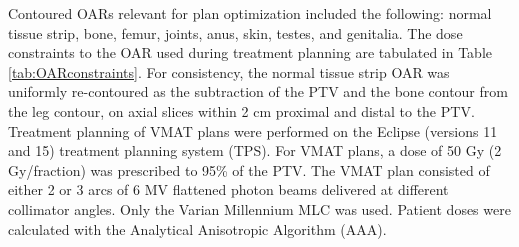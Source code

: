 \documentclass[aapm,graphicx,superscriptaddress]{revtex4-1}
\begin{document}
Contoured OARs relevant for plan optimization included the following: normal tissue strip, bone, femur, joints, anus, skin, testes, and genitalia. The dose constraints to the OAR used during treatment planning are tabulated in Table \ref{tab:OARconstraints}. For consistency, the normal tissue strip OAR was uniformly re-contoured as the subtraction of the PTV and the bone contour from the leg contour, on axial slices within 2 cm proximal and distal to the PTV.\\ 
Treatment planning of VMAT plans were performed on the Eclipse (versions 11 and 15) treatment planning system (TPS). For VMAT plans, a dose of 50 Gy (2 Gy/fraction) was prescribed to 95\% of the PTV. The VMAT plan consisted of either 2 or 3 arcs of 6 MV flattened photon beams delivered at different collimator angles. Only the Varian Millennium MLC was used. Patient doses were calculated with the Analytical Anisotropic Algorithm (AAA). \\
\end{document}
